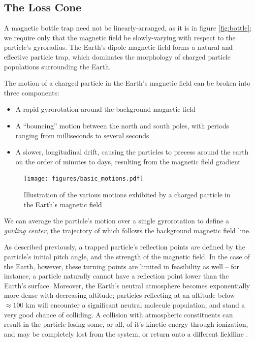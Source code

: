 \subsection{The Loss Cone}

A magnetic bottle trap need not be linearly-arranged, as it is in figure \ref{fig:bottle}; we require only that the magnetic field be slowly-varying with respect to the particle's gyroradius. The Earth's dipole magnetic field forms a natural and effective particle trap, which dominates the morphology of charged particle populations surrounding the Earth.

The motion of a charged particle in the Earth's magnetic field can be broken into three components: 
\begin{itemize}
\item A rapid gyrorotation around the background magnetic field
\item A ``bouncing'' motion between the north and south poles, with periods ranging from milliseconds to several seconds
\item A slower, longitudinal drift, causing the particles to precess around the earth on the order of minutes to days, resulting from the magnetic field gradient
\end{itemize}

\begin{figure}[ht]
\begin{center}
\texttt{[image: figures/basic\_motions.pdf]}
\caption[Adiabatic motion in the Earth's magnetic field]{Illustration of the various motions exhibited by a charged particle in the Earth's magnetic field}
\label{fig:adiabatic_motions}
\end{center}
\end{figure}

We can average the particle's motion over a single gyrorotation to define a \emph{guiding center}, the trajectory of which follows the background magnetic field line. 

As described previously, a trapped particle's reflection points are defined by the particle's initial pitch angle, and the strength of the magnetic field. In the case of the Earth, however, these turning points are limited in feasibility as well -- for instance, a particle naturally cannot have a reflection point lower than the Earth's surface. Moreover, the Earth's neutral atmosphere becomes exponentially more-dense with decreasing altitude; particles reflecting at an altitude below $\approx 100$ km will encounter a significant neutral molecule population, and stand a very good chance of colliding. A collision with atmospheric constituents can result in the particle losing some, or all, of it's kinetic energy through ionization, and may be completely lost from the system, or return onto a different fieldline \citep{Cotts2011}.

